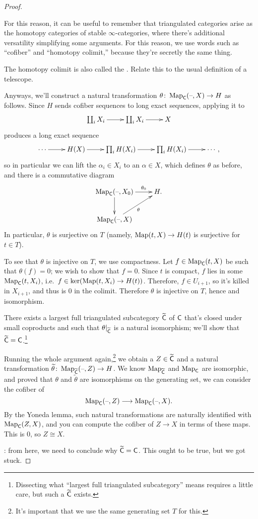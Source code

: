 \begin{proof}
\begin{rem}
For this reason, it can be useful to remember that triangulated categories arise as the homotopy categories of
stable $\infty$-categories, where there's additional versatility simplifying some arguments. For this reason, we
use words such as ``cofiber'' and ``homotopy colimit,'' because they're secretly the same thing. %
\end{rem}
\begin{ex}
The homotopy colimit is also called the . Relate this to the usual definition of a telescope.
\end{ex}
Anyways, we'll construct a natural transformation $\theta\colon\operatorname{Map}_\mathsf C(\text{--},X)\to H$ as follows. Since $H$ sends
cofiber sequences to long exact sequences, applying it to
\[\xymatrix{
	\coprod_i X_i\ar[r] & \coprod_i X_i\ar[r] & X
}\]
produces a long exact sequence
\[\xymatrix{
	\dotsb\ar[r] & H(X)\ar[r] & \prod_i H(X_i)\ar[r] & \prod_i H(X_i)\ar[r] & \dotsb,
}\]
so in particular we can lift the $\alpha_i\in X_i$ to an $\alpha\in X$, which defines $\theta$ as before, and there
is a commutative diagram
\[\xymatrix{
	\Map_\fC(\bl,X_0)\ar[r]^-{\theta_0}\ar[d] & H.\\
	\Map_\fC(\bl,X)\ar[ur]_{\theta}
}\]
In particular, $\theta$ is surjective on $T$ (namely, $\operatorname{Map}(t,X)\to H(t)$ is surjective for $t\in T$).

To see that $\theta$ is injective on $T$, we use compactness. Let $f\in\operatorname{Map}_\mathsf C(t,X)$ be such that $\theta(f) = 0$;
we wish to show that $f = 0$. Since $t$ is compact, $f$ lies in some $\operatorname{Map}_\mathsf C(t,X_i)$, i.e.\
$f\in\ker(\operatorname{Map}(t,X_i)\to H(t))$. Therefore, $f\in U_{i+1}$, so it's killed in $X_{i+1}$, and thus is $0$ in the
colimit. Therefore $\theta$ is injective on $T$, hence and isomorphism.

There exists a largest full triangulated subcategory $\widetilde{\mathsf C}$ of $\mathsf C$ that's closed under small coproducts
and such that $\theta|_{\widetilde{\mathsf C}}$ is a natural isomorphism; we'll show that $\widetilde{\mathsf C} =
\mathsf C$.\footnote{Dissecting what ``largest full triangulated subcategory'' means requires a little care, but such a
$\widetilde{\mathsf C}$ exists.}

Running the whole argument again,\footnote{It's important that we use the same generating set $T$ for this.} we
obtain a $Z\in\widetilde{\mathsf C}$ and a natural transformation $\widetilde\theta\colon\operatorname{Map}_{\widetilde{\mathsf C}}(\text{--},Z)\to H$.
We know $\operatorname{Map}_{\widetilde{\mathsf C}}$ and $\operatorname{Map}_\mathsf C$ are isomorphic, and proved that $\theta$ and $\widetilde\theta$ are
isomorphisms on the generating set, we can consider the cofiber of
\[\operatorname{Map}_\mathsf C(\text{--},Z)\longrightarrow\operatorname{Map}_\mathsf C(\text{--},X).\]
By the Yoneda lemma, such natural transformations are naturally identified with $\operatorname{Map}_\mathsf C(Z,X)$, and you can
compute the cofiber of $Z\to X$ in terms of these maps. This is $0$, so $Z\cong X$.

\TODO: from here, we need to conclude why $\widetilde{\mathsf C} = \mathsf C$. This ought to be true, but we got stuck.
\end{proof}
